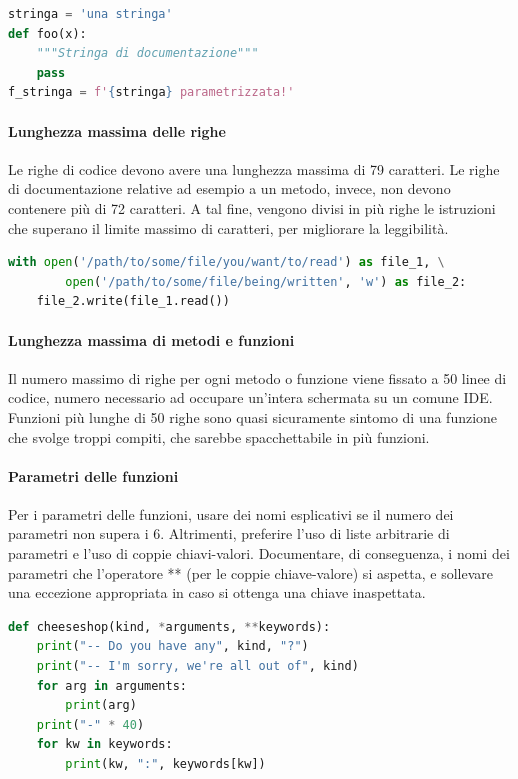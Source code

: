 \begin{lstlisting}[language=Python]
stringa = 'una stringa'
def foo(x):
	"""Stringa di documentazione"""
	pass
f_stringa = f'{stringa} parametrizzata!'
\end{lstlisting}

        \paragraph{Lunghezza massima delle righe}\label{PP:Sviluppo:Codifica:LunghezzaMassimaDelleRighe}
		Le righe di codice devono avere una lunghezza massima di 79 caratteri. Le righe di documentazione relative ad esempio a un metodo,
		invece, non devono contenere più di 72 caratteri.
		A tal fine, vengono divisi in più righe le istruzioni che superano il limite massimo di caratteri, per migliorare la leggibilità.

		\begin{lstlisting}[language=Python]
with open('/path/to/some/file/you/want/to/read') as file_1, \
        open('/path/to/some/file/being/written', 'w') as file_2:
	file_2.write(file_1.read())
		\end{lstlisting}


		\paragraph{Lunghezza massima di metodi e funzioni}\label{PP:Sviluppo:Codifica:LunghezzaMassimaDeiMetodi}
		Il numero massimo di righe per ogni metodo o funzione viene fissato a 50 linee di codice, numero necessario ad occupare un'intera
		schermata su un comune IDE. Funzioni più lunghe di 50 righe sono quasi sicuramente sintomo di una funzione che svolge troppi compiti,
		che sarebbe spacchettabile in più funzioni.

		\paragraph{Parametri delle funzioni}\label{PP:Sviluppo:Codifica:ParametriDelleFunzioni}
		Per i parametri delle funzioni, usare dei nomi esplicativi se il numero dei parametri non supera i 6. Altrimenti, preferire l'uso di liste
		arbitrarie di parametri e l'uso di coppie chiavi-valori. Documentare, di conseguenza,
		i nomi dei parametri che l'operatore ** (per le coppie chiave-valore) si aspetta, e sollevare una eccezione appropriata in caso si ottenga una chiave
		inaspettata.
\begin{lstlisting}[language=Python]
def cheeseshop(kind, *arguments, **keywords):
    print("-- Do you have any", kind, "?")
    print("-- I'm sorry, we're all out of", kind)
    for arg in arguments:
        print(arg)
    print("-" * 40)
    for kw in keywords:
        print(kw, ":", keywords[kw])
\end{lstlisting}

